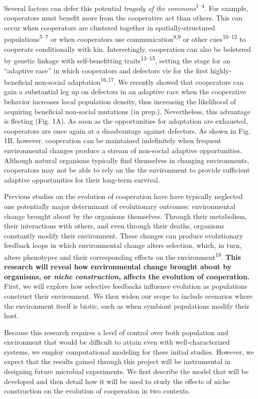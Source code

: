 \documentclass[10pt,]{article}
\begin{document}
Several factors can defer this potential \emph{tragedy of the
commons}\textsuperscript{1--4}. For example, cooperators must benefit more from
the cooperative act than others. This can occur when cooperators are clustered
together in spatially-structured populations\textsuperscript{5--7} or when
cooperators use communication\textsuperscript{8,9} or other
cues\textsuperscript{10--12} to cooperate conditionally with kin.
Interestingly, cooperation can also be bolstered by genetic linkage with
self-benefitting traits\textsuperscript{13--15}, setting the stage for an
``adaptive race'' in which cooperators and defectors vie for the first
highly-beneficial non-social adaptation\textsuperscript{16,17}. We recently
showed that cooperators can gain a substantial leg up on defectors in an
adaptive race when the cooperative behavior increases local population density,
thus increasing the likelihood of acquiring beneficial non-social mutations (in
prep.).  Nevertheless, this advantage is fleeting (Fig. 1A). As soon as the
opportunities for adaptation are exhausted, cooperators are once again at a
disadvantage against defectors. As shown in Fig. 1B, however, cooperation can
be maintained indefinitely when frequent environmental changes produce a stream
of non-social adaptive opportunities. Although natural organisms typically find
themselves in changing environments, cooperators may not be able to rely on the
the environment to provide sufficient adaptive opportunities for their
long-term survival.

Previous studies on the evolution of cooperation have have typically
neglected one potentially major determinant of evolutionary outcomes:
environmental change brought about by the organisms themselves. Through
their metabolism, their interactions with others, and even through their
deaths, organisms constantly modify their environment. These changes can
produce evolutionary feedback loops in which environmental change alters
selection, which, in turn, alters phenotypes and their corresponding
effects on the environment\textsuperscript{18}. \textbf{This research
will reveal how environmental change brought about by organisms, or \emph{niche
construction}, affects the evolution of cooperation.} First, we will
explore how selective feedbacks influence evolution as populations
construct their environment. We then widen our scope to include
scenarios where the environment itself is biotic, such as when symbiont
populations modify their host.

Because this research requires a level of control over both population
and environment that would be difficult to attain even with
well-characterized systems, we employ computational modeling for these
initial studies. However, we expect that the results gained through this
project will be instrumental in designing future microbial experiments.
We first describe the model that will be developed and then detail how
it will be used to study the effects of niche construction on the
evolution of cooperation in two contexts.
\end{document}
